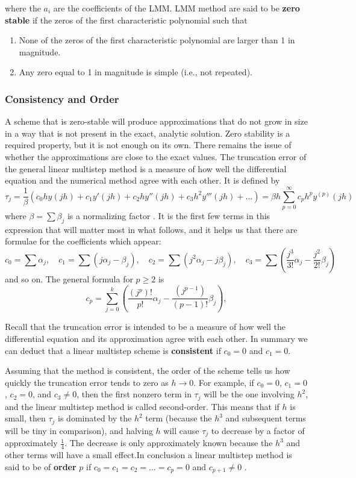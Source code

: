  where the $a_i$ are the coefficients of the LMM.
 LMM method are said to be \textbf{zero stable} if the zeros of the first characteristic polynomial such that

 \begin{enumerate}
  \item None of the zeros of the first characteristic polynomial are larger than 1 in magnitude.
  \item Any zero equal to 1 in magnitude is simple (i.e., not repeated).
\end{enumerate}

\subsubsection*{Consistency and Order}
A scheme that is zero-stable will produce approximations that do not grow in size in a way that is not present in the exact, analytic solution. Zero stability is a required property, but it is not enough on its own. There remains the issue of whether the approximations are close to the exact values. The truncation error of the general linear multistep method is a measure of how well the differential equation and the numerical method agree with each other. It is defined by
\[
\tau_j = \frac{1}{\beta} \left( c_0 h y(jh) + c_1 y'(jh) + c_2 h y''(jh) + c_3 h^2 y'''(jh) + \ldots \right) = \beta h \sum_{p=0}^{\infty} c_p h^p y^{(p)}(jh)
\]
where $\beta = \sum \beta_j$ is a normalizing factor \cite{2022JFatokunEtAl}.
It is the first few terms in this expression that will matter most in what follows, and it helps us that there are formulae for the coefficients which appear:
\[
c_0 = \sum \alpha_j, \quad c_1 = \sum (j\alpha_j - \beta_j), \quad c_2 = \sum \left( j^2 \alpha_j - j \beta_j \right), \quad c_3 = \sum \left( \frac{j^3}{3!} \alpha_j - \frac{j^2}{2!} \beta_j \right)
\]
and so on. The general formula for $p \geq 2$ is
\[
  c_p = \sum_{j=0}^{k} \left( \frac{(j^p)!}{p!} \alpha_j - \frac{(j^{p-1})}{(p-1)!} \beta_j \right),
\]

Recall that the truncation error is intended to be a measure of how well the differential equation and its approximation agree with each other\cite{HELM2008NumericalIVP}. In summary we can deduct that a linear multistep scheme is \textbf{consistent} if $c_0 = 0$ and $c_1 = 0$.


Assuming that the method is consistent, the order of the scheme tells us how quickly the truncation error tends to zero as $h \rightarrow 0$. For example, if $c_0 = 0$, $c_1 = 0$, $c_2 = 0$, and $c_3 \neq 0$, then the first nonzero term in $\tau_j$ will be the one involving $h^2$, and the linear multistep method is called second-order. This means that if $h$ is small, then $\tau_j$ is dominated by the $h^2$ term (because the $h^3$ and subsequent terms will be tiny in comparison), and halving $h$ will cause $\tau_j$ to decrease by a factor of approximately $\frac{1}{4}$. The decrease is only approximately known because the $h^3$ and other terms will have a small effect.In conclusion a linear multistep method is said to be of \textbf{order} $p$ if $c_0 = c_1 = c_2 = \ldots = c_p = 0$ and $c_{p+1} \neq 0$ \cite{HELM2008NumericalIVP}.

